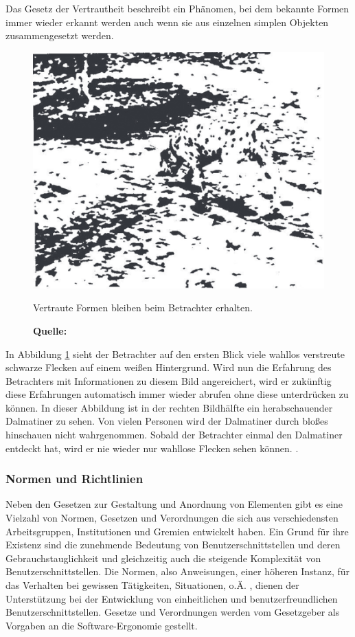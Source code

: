 Das Gesetz der Vertrautheit beschreibt ein Phänomen, bei dem bekannte Formen immer wieder erkannt werden auch wenn sie aus einzelnen simplen Objekten zusammengesetzt werden.
\begin{figure}[H]
  \centering
  \includegraphics[scale=0.7]{img/gesetz_der_Vertrautheit.PNG}
  \caption{Vertraute Formen bleiben beim Betrachter erhalten.}
  \caption*{\textbf{Quelle:} \citep{Dahm2006}}
  \label{fig:vertrautheit}
\end{figure}
In Abbildung \ref{fig:vertrautheit} sieht der Betrachter auf den ersten Blick viele wahllos verstreute schwarze Flecken auf einem weißen Hintergrund. Wird nun die Erfahrung des Betrachters mit Informationen zu diesem Bild angereichert, wird er zukünftig diese Erfahrungen automatisch immer wieder abrufen ohne diese unterdrücken zu können. In dieser Abbildung ist in der rechten Bildhälfte ein herabschauender Dalmatiner zu sehen. Von vielen Personen wird der Dalmatiner durch bloßes hinschauen nicht wahrgenommen. Sobald der Betrachter einmal den Dalmatiner entdeckt hat, wird er nie wieder nur wahllose Flecken sehen können. \citep[vgl.][63f]{Dahm2006}.

\subsubsection{Normen und Richtlinien}
Neben den Gesetzen zur Gestaltung und Anordnung von Elementen gibt es eine Vielzahl von Normen, Gesetzen und Verordnungen die sich aus verschiedensten Arbeitsgruppen, Institutionen und Gremien entwickelt haben. Ein Grund für ihre Existenz sind die zunehmende Bedeutung von Benutzerschnittstellen und deren Gebrauchstauglichkeit und gleichzeitig auch die steigende Komplexität von Benutzerschnittstellen. Die Normen, also Anweisungen, einer höheren Instanz, für das Verhalten bei gewissen Tätigkeiten, Situationen, o.Ä. \citep[vgl.][]{duden}, dienen der Unterstützung bei der Entwicklung von einheitlichen und benutzerfreundlichen Benutzerschnittstellen. Gesetze und Verordnungen werden vom Gesetzgeber als Vorgaben an die Software-Ergonomie gestellt.

